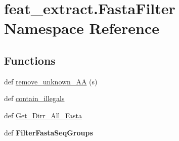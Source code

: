 \hypertarget{namespacefeat__extract_1_1_fasta_filter}{}\section{feat\+\_\+extract.\+Fasta\+Filter Namespace Reference}
\label{namespacefeat__extract_1_1_fasta_filter}
\subsection*{Functions}
\begin{DoxyCompactItemize}
\item 
def \hyperlink{namespacefeat__extract_1_1_fasta_filter_ac5365277e337fab6052910b07a8f6087}{remove\+\_\+unknown\+\_\+\+A\+A} (s)
\item 
def \hyperlink{namespacefeat__extract_1_1_fasta_filter_a6b6a8eca64864960e923d555fb6d81b3}{contain\+\_\+illegals}
\item 
def \hyperlink{namespacefeat__extract_1_1_fasta_filter_aff7ada2a6f901e17fac38246c970aeff}{Get\+\_\+\+Dirr\+\_\+\+All\+\_\+\+Fasta}
\item 
\hypertarget{namespacefeat__extract_1_1_fasta_filter_a7f6b66b5611f58928a75cf2933962044}{}def {\bfseries Filter\+Fasta\+Seq\+Groups}\label{namespacefeat__extract_1_1_fasta_filter_a7f6b66b5611f58928a75cf2933962044}

\end{DoxyCompactItemize}

